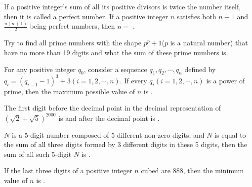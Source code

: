 \begin{problem}\label{Alg12}
If a positive integer's sum of all its positive divisors is twice the number itself, then it is called a perfect number. If a positive integer $n$ satisfies both $n-1$ and $\frac{n(n+1)}{2}$ being perfect numbers, then $n=$ \underline{\hspace{2cm}}.
	
\end{problem}


\begin{problem}\label{Alg13}
	
Try to find all prime numbers with the shape $p^p+1$($p$ is a natural number) that have no more than 19 digits and what the sum of these prime numbers is.
	
	
\end{problem}




\begin{problem}\label{Alg14}
	
For any positive integer $q_0$, consider a sequence $q_1,q_2,\cdots,q_n$ defined by $q_i=\left(q_{i-1}-1\right)^3+3\left(i=1,2,\cdots,n\right)$. If every $q_i\left(i=1,2,\cdots,n\right)$ is a power of prime, then the maximum possible value of $n$ is \underline{\hspace{2cm}}.
	
\end{problem}




\begin{problem}\label{Alg15}
	The first digit before the decimal point in the decimal representation of $(\sqrt{2} + \sqrt{5})^{2000}$ is \underline{\hspace{2cm}} and after the decimal point is \underline{\hspace{2cm}}.
	
\end{problem}


\begin{problem}\label{Alg16}
	
$N$ is a 5-digit number composed of 5 different non-zero digits, and $N$ is equal to the sum of all three digits formed by 3 different digits in these 5 digits, then the sum of all such 5-digit $N$ is \underline{\hspace{2cm}}.
\end{problem}


\begin{problem}\label{Alg17}
If the last three digits of a positive integer $n$ cubed are 888, then the minimum value of $n$ is \underline{\hspace{2cm}}.
\end{problem}


